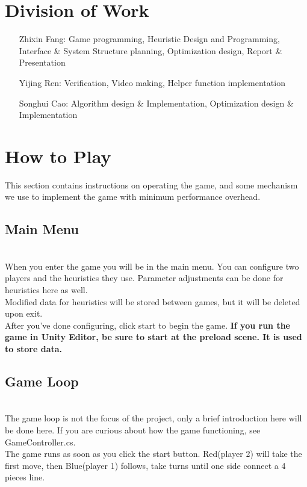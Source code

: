 \documentclass[12pt,a4paper]{article}
\begin{document}
	\section{Division of Work}
	\begin{enumerate}
		\item [Zhixin Fang:] Game programming, Heuristic Design and Programming, Interface \& System Structure planning, Optimization design, Report \& Presentation
		\item [Yijing Ren:] Verification, Video making, Helper function implementation
		\item [Songhui Cao:] Algorithm design \& Implementation, Optimization design \& Implementation
	\end{enumerate}
	\section{How to Play}
	This section contains instructions on operating the game, and some mechanism we use to implement the game with minimum performance overhead.\\
	
	
	\subsection{Main Menu}
	\quad \\
	
	When you enter the game you will be in the main menu. You can configure two players and the heuristics they use. Parameter adjustments can be done for heuristics here as well.\\
	
	Modified data for heuristics will be stored between games, but it will be deleted upon exit.\\
	
	After you've done configuring, click start to begin the game.
	\textbf{If you run the game in Unity Editor, be sure to start at the preload scene. It is used to store data.}
	\subsection{Game Loop}
	\quad\\
	
	The game loop is not the focus of the project, only a brief introduction here will be done here. If you are curious about how the game functioning, see GameController.cs.\\
	
	The game runs as soon as you click the start button. Red(player 2) will take the first move, then Blue(player 1) follows, take turns until one side connect a 4 pieces line.\\
	
\end{document}
